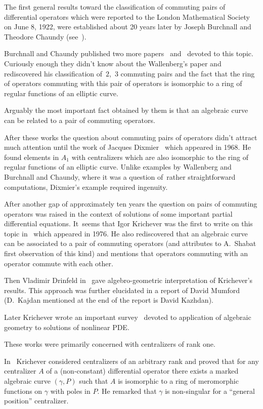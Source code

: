 \documentclass[10pt,a4paper]{amsart}
\numberwithin{equation}{section}
\newcommand{\ga}{\gamma}
\begin{document}
The first general results toward the classification of commuting pairs of differential operators which were reported to the London Mathematical Society on June 8, 1922, were established about 20 years later by Joseph Burchnall and Theodore Chaundy (see~\cite{BC1}).

Burchnall and Chaundy published two more papers~\cite{BC2} and~\cite{BC3} devoted to this topic. Curiously enough they didn't know about the Wallenberg's paper and rediscovered his classification of~$2$,~$3$ commuting pairs and the fact that the ring of operators commuting with this pair of operators is isomorphic to a ring of regular functions of an elliptic curve.

Arguably the most important fact obtained by them is that an algebraic curve can be related to a pair of commuting operators.

After these works the question about commuting pairs of operators didn't attract much attention until the work of Jacques Dixmier~\cite{D}
which appeared in 1968. He found elements in $A_1$ with centralizers which are also isomorphic to the ring of regular functions of an elliptic curve. Unlike examples by Wallenberg and Burchnall and Chaundy, where it was a question of~rather straightforward computations, Dixmier's example required ingenuity.

After another gap of approximately ten years the question on pairs of commuting operators was raised in the context of solutions of some important partial differential equations.
It~seems that Igor Krichever was the first to write on this topic in~\cite{K1} which appeared in 1976. He also rediscovered that an algebraic curve can be associated to a pair of commuting operators (and attributes to A.~Shabat first observation of this kind) and mentions that operators commuting with an operator commute with each other.

Then Vladimir Drinfeld in~\cite{Dr} gave algebro-geometric interpretation of Krichever's results. This approach was further elucidated in a report of David Mumford~\cite{Mum} (D.~Kajdan mentioned at the end
of the report is David Kazhdan).

Later Krichever wrote an important survey~\cite{K2} devoted to application of algebraic geometry to solutions of nonlinear PDE.

These works were primarily concerned with centralizers of rank one.

In~\cite{K3} Krichever considered centralizers of an arbitrary rank and proved that for any centralizer $A$ of a (non-constant) differential operator there exists a marked algebraic curve $(\ga, P)$
such that $A$ is isomorphic to a ring of meromorphic functions on $\ga$ with poles in $P$. He remarked that $\ga$ is non-singular for a ``general position'' centralizer.
\end{document}
